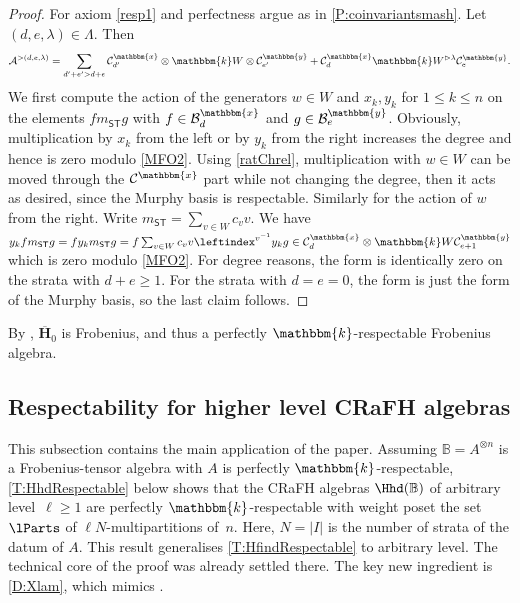 \documentclass[a4paper,11pt]{amsart}
\newcommand\cB{\mathcal{B}}
\numberwithin{equation}{subsection}
\theoremstyle{definition}
\theoremstyle{theorem}
\theoremstyle{remark}
\newcommand\CA{\mathcal{A}}
\newcommand\Sym{W}
\newcommand\bS{{\mathsf{S}}}
\newcommand\bT{{\mathsf{T}}}
\newcommand\kk{\mathbbm{k}}
\newcommand{\Bo}{\mathbb{B}}
\begin{document}
\begin{proof}
  For axiom \autoref{resp1} and perfectness argue as in \autoref{P:coinvariantsmash}.  Let $(d,e,\lambda)\in\Lambda$. Then
  \begin{equation}\label{MFO2}
    \CA^{>(d,e,\lambda)}=\sum_{d'+e'>d+e}\mathcal{C}^{\mathbbm{x}}_{d'}\otimes \kk\Sym\otimes \mathcal{C}^{\mathbbm{y}}_{e'}+\mathcal{C}^{\mathbbm{x}}_d\kk\Sym^{\vartriangleright\lambda}\mathcal{C}^{\mathbbm{y}}_e.
  \end{equation}
  We first compute the action of the generators $w\in\Sym$ and $x_k,y_k$ for $1\le k\le n$ on the elements $fm_{\bS\bT}g$ with $f\in\cB^\mathbbm{x}_d$ and $g\in\cB^\mathbbm{y}_e$. Obviously, multiplication by $x_k$ from the left or by $y_k$ from the right increases the degree and hence is zero modulo \autoref{MFO2}.
 Using \autoref{ratChrel},  multiplication with $w\in\Sym$ can be moved
 through the $\mathcal{C}^{\mathbbm{x}}$ part while not changing the
 degree, then it acts as desired, since the Murphy basis is respectable.
 Similarly for the action of $w$ from the right.
  Write $m_{\bS\bT}=\sum_{v\in\Sym}c_vv$. We have $y_kfm_{\bS\bT}g=fy_k m_{\bS\bT}g=
    f\sum_{v\in\Sym}c_vv \leftindex^{v^{-1}}y_kg\in
    \mathcal{C}^{\mathbbm{x}}_d \otimes\kk\Sym
    \mathcal{C}^{\mathbbm{y}}_{e+1}$ which is zero modulo
    \autoref{MFO2}.  For degree reasons, the form is identically zero on
    the strata with $d+e\ge1$. For the strata with $d=e=0$, the form is
    just the form of the Murphy basis, so the  last claim follows.
\end{proof}
  By \cite[Section~3.1]{BGS:Frobenius}, $\overline{\mathbf H}_0$ is Frobenius, and thus a perfectly $\kk$-respectable Frobenius algebra.
\subsection{Respectability for higher level CRaFH algebras}
\label{SS:HigherLevelRespectable}
This subsection contains the main application of the paper. Assuming $\Bo=A^{\otimes n}$ is a Frobenius-tensor algebra with $A$ is perfectly $\kk$-respectable, \autoref{T:HhdRespectable} below shows that the CRaFH algebras $\Hhd(\Bo)$  of arbitrary level~$\ell\ge1$ are perfectly $\kk$-respectable with weight poset the set $\lParts$ of $\ell N$-multipartitions of~$n$. Here, $N=|I|$ is the number of strata of the datum of $A$. This result generalises \autoref{T:HfindRespectable} to arbitrary level. The technical core of the proof was already settled there. The key new ingredient is \autoref{D:Xlam}, which mimics \cite[Definition~3.1]{DJM:cyc}.
\end{document}
